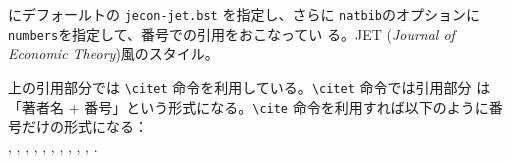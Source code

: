 \documentclass[10pt]{jarticle}
\begin{document}
\verb|| にデフォールトの \verb|jecon-jet.bst| を指定し、さらに
\verb|natbib|のオプションに\verb|numbers|を指定して、番号での引用をおこなってい
る。JET (\textit{Journal of Economic Theory})風のスタイル。
\vspace{1em}\\



\vspace{1em}

上の引用部分では \verb|\citet| 命令を利用している。\verb|\citet| 命令では引用部分
は「著者名 + 番号」という形式になる。\verb|\cite| 命令を利用すれば以下のように番
号だけの形式になる：\\
\cite{40020418914}, \cite{yamazaki13:_japan},
\cite{takeda2013jecon}, \cite{Takeda2012a}, \cite{arimura-takeda2012},
\cite{matloff__2012}, \cite{Boswell-2012}, \cite{takeda2012_cge},
\cite{Takeda2011b}, \cite{takeda2011c}, \cite{40018847518}.

\nocite{*}


% 

%

\end{document}

